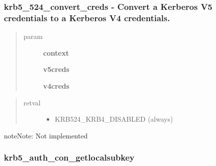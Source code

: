 \documentclass[letterpaper,10pt,english]{sphinxmanual}
\begin{document}
\subsubsection{krb5\_524\_convert\_creds -  Convert a Kerberos V5 credentials to a Kerberos V4 credentials.}
\label{appdev/refs/api/krb5_524_convert_creds:krb5-524-convert-creds-convert-a-kerberos-v5-credentials-to-a-kerberos-v4-credentials}\label{appdev/refs/api/krb5_524_convert_creds::doc}

\begin{fulllineitems}
\label{appdev/refs/api/krb5_524_convert_creds:c.krb5_524_convert_creds}
\end{fulllineitems}

\begin{quote}\begin{description}
\item[{param}] \leavevmode
\textbf{context}

\textbf{v5creds}

\textbf{v4creds}

\end{description}\end{quote}
\begin{quote}\begin{description}
\item[{retval}] \leavevmode\begin{itemize}
\item {} 
KRB524\_KRB4\_DISABLED   (always)

\end{itemize}

\end{description}\end{quote}

\begin{notice}{note}{Note:}
Not implemented
\end{notice}


\subsubsection{krb5\_auth\_con\_getlocalsubkey}
\label{appdev/refs/api/krb5_auth_con_getlocalsubkey::doc}\label{appdev/refs/api/krb5_auth_con_getlocalsubkey:krb5-auth-con-getlocalsubkey}
\end{document}
